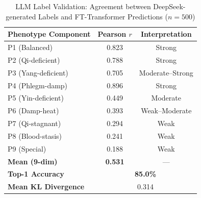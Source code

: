 \documentclass{article}
\begin{document}
\begin{table}[htbp]
\centering
\caption{LLM Label Validation: Agreement between DeepSeek-generated Labels and FT-Transformer Predictions ($n = 500$)}
\label{tab:llm_validation}
\begin{tabular}{lcc} 
\toprule
\textbf{Phenotype Component} & \textbf{Pearson $r$} & \textbf{Interpretation} \\
\midrule
P1 (Balanced)      & 0.823 & Strong \\
P2 (Qi-deficient)  & 0.788 & Strong \\
P3 (Yang-deficient) & 0.705 & Moderate--Strong \\
P4 (Phlegm-damp)   & 0.896 & Strong \\
P5 (Yin-deficient) & 0.449 & Moderate \\
P6 (Damp-heat)     & 0.393 & Weak--Moderate \\
P7 (Qi-stagnant)   & 0.294 & Weak \\
P8 (Blood-stasis)  & 0.241 & Weak \\
P9 (Special)       & 0.188 & Weak \\
\midrule
\textbf{Mean (9-dim)} & \textbf{0.531} & --- \\
\midrule
\textbf{Top-1 Accuracy}     & \multicolumn{2}{c}{\textbf{85.0\%}} \\
\textbf{Mean KL Divergence} & \multicolumn{2}{c}{0.314} \\
\bottomrule
\end {tabular}
\end{table}
\end{document}
